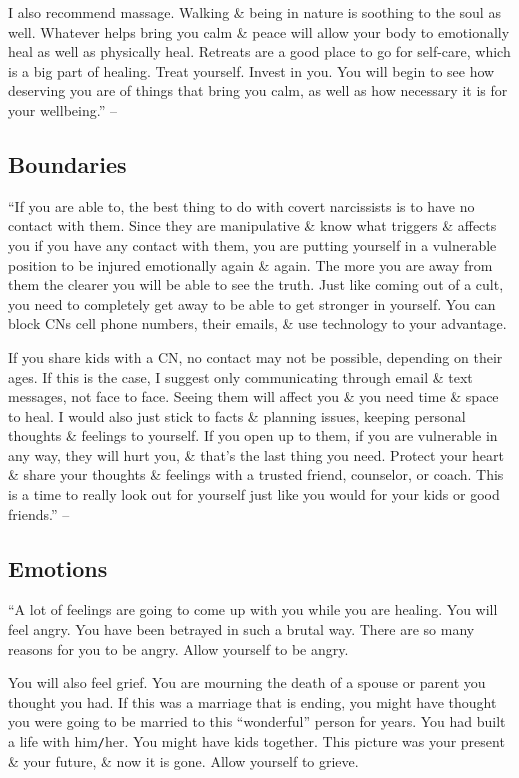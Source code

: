 \documentclass{article}
\numberwithin{equation}{section}
\begin{document}
I also recommend massage. Walking \& being in nature is soothing to the soul as well. Whatever helps bring you calm \& peace will allow your body to emotionally heal as well as physically heal. Retreats are a good place to go for self-care, which is a big part of healing. Treat yourself. Invest in you. You will begin to see how deserving you are of things that bring you calm, as well as how necessary it is for your wellbeing.'' -- \cite[pp. 160--162]{Mirza2017}

\subsection{Boundaries}
``If you are able to, the best thing to do with covert narcissists is to have no contact with them. Since they are manipulative \& know what triggers \& affects you if you have any contact with them, you are putting yourself in a vulnerable position to be injured emotionally again \& again. The more you are away from them the clearer you will be able to see the truth. Just like coming out of a cult, you need to completely get away to be able to get stronger in yourself. You can block CNs cell phone numbers, their emails, \& use technology to your advantage.

If you share kids with a CN, no contact may not be possible, depending on their ages. If this is the case, I suggest only communicating through email \& text messages, not face to face. Seeing them will affect you \& you need time \& space to heal. I would also just stick to facts \& planning issues, keeping personal thoughts \& feelings to yourself. If you open up to them, if you are vulnerable in any way, they will hurt you, \& that's the last thing you need. Protect your heart \& share your thoughts \& feelings with a trusted friend, counselor, or coach. This is a time to really look out for yourself just like you would for your kids or good friends.'' -- \cite[p. 162]{Mirza2017}

\subsection{Emotions}
``A lot of feelings are going to come up with you while you are healing. You will feel angry. You have been betrayed in such a brutal way. There are so many reasons for you to be angry. Allow yourself to be angry.

You will also feel grief. You are mourning the death of a spouse or parent you thought you had. If this was a marriage that is ending, you might have thought you were going to be married to this ``wonderful'' person for years. You had built a life with him{\tt/}her. You might have kids together. This picture was your present \& your future, \& now it is gone. Allow yourself to grieve.
\end{document}
